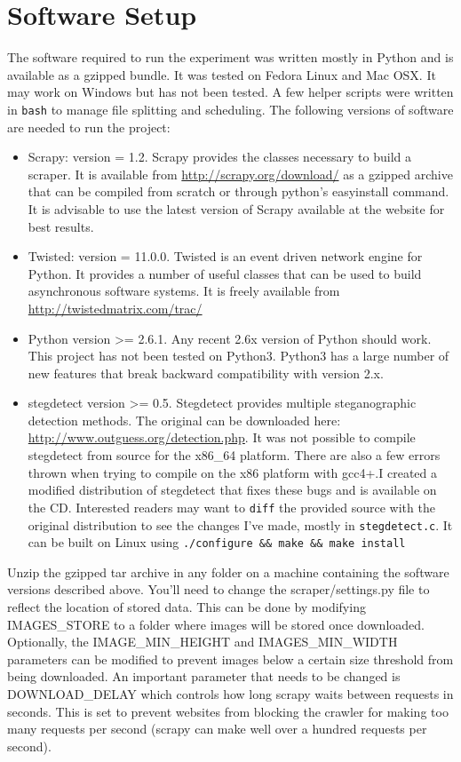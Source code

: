 \appendix
\appendixpage
\addappheadtotoc
\chapter{Software Setup}
\label{appendix:setup}
The software required to run the experiment was written mostly in Python and is available as a gzipped bundle. It was tested on Fedora Linux and Mac OSX. It may work on Windows but has not been tested. A few helper scripts were written in \texttt{bash} to manage file splitting and scheduling. The following versions of software are needed  to run the project:
\begin{itemize}
\item{Scrapy}: version = 1.2. Scrapy provides the classes necessary to build a scraper. It is available from \url{http://scrapy.org/download/} as a gzipped archive that can be compiled from scratch or through python's easyinstall command. It is advisable to use the latest version of Scrapy available at the website for best results. 
\item{Twisted}: version = 11.0.0. Twisted is an event driven network engine for Python. It provides a number of useful classes that can be used to build asynchronous software systems. It is freely available from \url{http://twistedmatrix.com/trac/}
\item{Python} version >= 2.6.1. Any recent 2.6x version of Python should work. This project has not been tested on Python3. Python3 has a large number of new features that break backward compatibility with version 2.x.
\item{stegdetect} version >= 0.5. Stegdetect provides multiple steganographic detection methods. The original can be downloaded here: \url{http://www.outguess.org/detection.php}. It was not possible to compile stegdetect from source for the x86\_64 platform. There are also a few errors thrown when trying to compile on the x86 platform with gcc4+.I created a modified distribution of stegdetect that fixes these bugs and is available on the CD. Interested readers may want to \texttt{diff} the provided source with the original distribution to see the changes I've made, mostly in \texttt{stegdetect.c}. It can be built on Linux using \texttt{./configure \&\& make \&\& make install}
\end{itemize}
Unzip the gzipped tar archive in any folder on a machine containing the software versions described above. You'll need to change the scraper/settings.py file to reflect the location of stored data. This can be done by modifying IMAGES\_STORE to a folder where images will be stored once downloaded. Optionally, the IMAGE\_MIN\_HEIGHT and IMAGES\_MIN\_WIDTH parameters can be modified to prevent images below a certain size threshold from being downloaded. An important parameter that needs to be changed is DOWNLOAD\_DELAY which controls how long scrapy waits between requests in seconds. This is set to prevent websites from blocking the crawler for making too many requests per second (scrapy can make well over a hundred requests per second).
